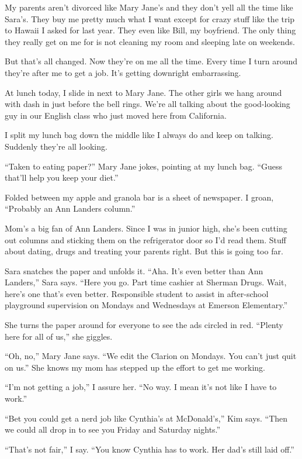 \documentclass[
]{article}
\begin{document}
My parents aren't divorced like Mary Jane's and they don't yell all the
time like Sara's. They buy me pretty much what I want except for crazy
stuff like the trip to Hawaii I asked for last year. They even like
Bill, my boyfriend. The only thing they really get on me for is not
cleaning my room and sleeping late on weekends.

But that's all changed. Now they're on me all the time. Every time I
turn around they're after me to get a job. It's getting downright
embarrassing.

At lunch today, I slide in next to Mary Jane. The other girls we hang
around with dash in just before the bell rings. We're all talking about
the good-looking guy in our English class who just moved here from
California.

I split my lunch bag down the middle like I always do and keep on
talking. Suddenly they're all looking.

``Taken to eating paper?'' Mary Jane jokes, pointing at my lunch bag.
``Guess that'll help you keep your diet.''

Folded between my apple and granola bar is a sheet of newspaper. I
groan, ``Probably an Ann Landers column.''

Mom's a big fan of Ann Landers. Since I was in junior high, she's been
cutting out columns and sticking them on the refrigerator door so I'd
read them. Stuff about dating, drugs and treating your parents right.
But this is going too far.

Sara snatches the paper and unfolds it. ``Aha. It's even better than Ann
Landers,'' Sara says. ``Here you go. Part time cashier at Sherman Drugs.
Wait, here's one that's even better. Responsible student to assist in
after-school playground supervision on Mondays and Wednesdays at Emerson
Elementary.''

She turns the paper around for everyone to see the ads circled in red.
``Plenty here for all of us,'' she giggles.

``Oh, no,'' Mary Jane says. ``We edit the Clarion on Mondays. You can't
just quit on us.'' She knows my mom has stepped up the effort to get me
working.

``I'm not getting a job,'' I assure her. ``No way. I mean it's not like
I have to work.''

``Bet you could get a nerd job like Cynthia's at McDonald's,'' Kim says.
``Then we could all drop in to see you Friday and Saturday nights.''

``That's not fair,'' I say. ``You know Cynthia has to work. Her dad's
still laid off.''
\end{document}
